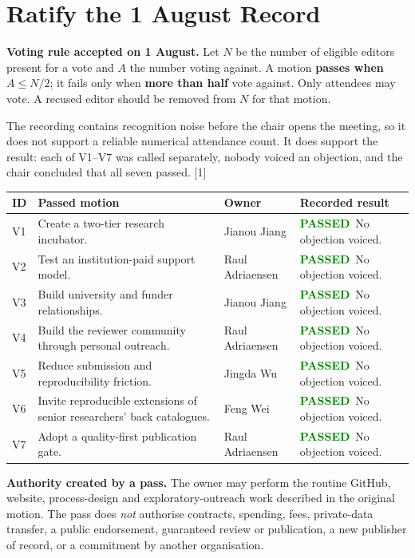 \documentclass[11pt]{article}
\newcommand{\src}[1]{{\footnotesize\color{ink3}[#1]}}
\newcommand{\passed}{\colorbox{greenbg}{\textcolor{green}{\sffamily\scriptsize\bfseries PASSED}}}
\begin{document}
\section{Ratify the 1 August Record}

\begin{takeaway}
\textbf{Voting rule accepted on 1 August.} Let $N$ be the number of eligible editors present for a vote and $A$ the number voting against. A motion \textbf{passes when $A\leq N/2$}; it fails only when \textbf{more than half} vote against. Only attendees may vote. A recused editor should be removed from $N$ for that motion.
\end{takeaway}

The recording contains recognition noise before the chair opens the meeting, so it does not support a reliable numerical attendance count. It does support the result: each of V1--V7 was called separately, nobody voiced an objection, and the chair concluded that all seven passed. \src{1}

{\small\renewcommand{\arraystretch}{1.2}
\begin{longtable}{@{}p{0.75cm}p{7.6cm}p{2.65cm}p{3.25cm}@{}}
\toprule
\textbf{ID} & \textbf{Passed motion} & \textbf{Owner} & \textbf{Recorded result} \\
\midrule
\endhead
\bottomrule
\endlastfoot
V1 & Create a two-tier research incubator. & Jianou Jiang & \passed\ No objection voiced. \\
V2 & Test an institution-paid support model. & Raul Adriaensen & \passed\ No objection voiced. \\
V3 & Build university and funder relationships. & Jianou Jiang & \passed\ No objection voiced. \\
V4 & Build the reviewer community through personal outreach. & Raul Adriaensen & \passed\ No objection voiced. \\
V5 & Reduce submission and reproducibility friction. & Jingda Wu & \passed\ No objection voiced. \\
V6 & Invite reproducible extensions of senior researchers' back catalogues. & Feng Wei & \passed\ No objection voiced. \\
V7 & Adopt a quality-first publication gate. & Raul Adriaensen & \passed\ No objection voiced. \\
\end{longtable}}

\textbf{Authority created by a pass.} The owner may perform the routine GitHub, website, process-design and exploratory-outreach work described in the original motion. The pass does \emph{not} authorise contracts, spending, fees, private-data transfer, a public endorsement, guaranteed review or publication, a new publisher of record, or a commitment by another organisation.
\end{document}
